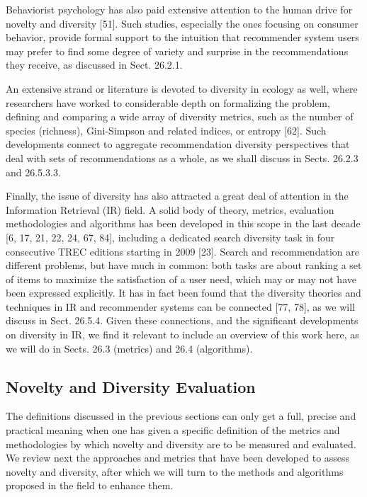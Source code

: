 Behaviorist psychology has also paid extensive attention to the human drive for novelty and diversity [51]. Such studies, especially the ones focusing on consumer behavior, provide formal support to the intuition that recommender system users may prefer to find some degree of variety and surprise in the recommendations they receive, as discussed in Sect. 26.2.1.

An extensive strand or literature is devoted to diversity in ecology as well, where researchers have worked to considerable depth on formalizing the problem, defining and comparing a wide array of diversity metrics, such as the number of species (richness), Gini-Simpson and related indices, or entropy [62]. Such developments connect to aggregate recommendation diversity perspectives that deal with sets of recommendations as a whole, as we shall discuss in Sects. 26.2.3 and 26.5.3.3.

Finally, the issue of diversity has also attracted a great deal of attention in the Information Retrieval (IR) field. A solid body of theory, metrics, evaluation methodologies and algorithms has been developed in this scope in the last decade [6, 17, 21, 22, 24, 67, 84], including a dedicated search diversity task in four consecutive TREC editions starting in 2009 [23]. Search and recommendation are different problems, but have much in common: both tasks are about ranking a set of items to maximize the satisfaction of a user need, which may or may not have been expressed explicitly. It has in fact been found that the diversity theories and techniques in IR and recommender systems can be connected [77, 78], as we will discuss in Sect. 26.5.4. Given these connections, and the significant developments on diversity in IR, we find it relevant to include an overview of this work here, as we will do in Sects. 26.3 (metrics) and 26.4 (algorithms).

\subsection{Novelty and Diversity Evaluation}

The definitions discussed in the previous sections can only get a full, precise and practical meaning when one has given a specific definition of the metrics and methodologies by which novelty and diversity are to be measured and evaluated. We review next the approaches and metrics that have been developed to assess novelty and diversity, after which we will turn to the methods and algorithms proposed in the field to enhance them.

